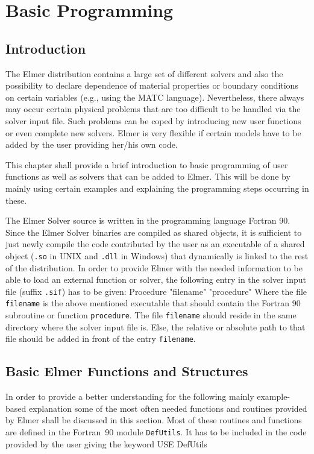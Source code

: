 \chapter{Basic Programming}
\noindent
\section{Introduction}
The Elmer distribution contains a large set of different solvers and also the possibility to declare dependence of material properties or boundary conditions on certain variables (e.g., using the MATC language). Nevertheless, there always may occur certain physical problems that are too difficult to be handled via the solver input file. Such problems can be coped by introducing new user functions or even complete new solvers. Elmer is very flexible if certain models have to be added by the user providing her/his own code. 

This chapter shall provide a brief introduction to basic programming of user functions as well as solvers that can be added to Elmer. This will be done by mainly using certain examples and explaining the programming steps occurring in these. 

The Elmer Solver source is written in the programming language Fortran 90. Since the Elmer Solver binaries are compiled as shared objects, it is sufficient to just newly compile the code contributed by the user as an executable of a shared object (\texttt{.so} in UNIX and \texttt{.dll} in Windows) that dynamically is linked to the rest of the distribution. In order to provide Elmer with the needed information to be able to load an external function or solver, the following entry in the solver input file (suffix \texttt{.sif}) has to be given:
\ttbegin
  Procedure "filename" "procedure"
\ttend
Where the file \texttt{filename} is the above mentioned executable that should contain the Fortran 90 subroutine or function \texttt{procedure}. The file \texttt{filename} should reside in the same directory where the solver input file is. Else, the relative or absolute path to that file should be added in front of the entry \texttt{filename}.

\section{Basic Elmer Functions and Structures \label{programming:defUtils}}
In order to provide a better understanding for the following mainly example-based explanation some of the most often needed functions and routines provided by Elmer shall be discussed in this section. Most of these routines and functions are defined in the Fortran~90 module \texttt{DefUtils}. It has to be included in the code provided by the user giving the keyword
\ttbegin
USE DefUtils
\ttend

